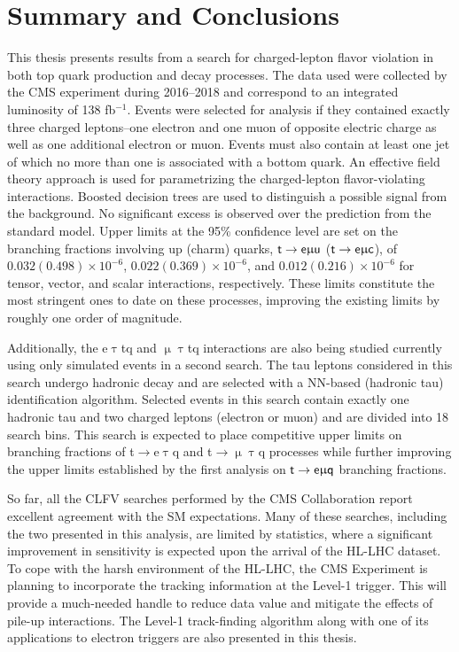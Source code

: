 \chapter{Summary and Conclusions}
\label{chap:Conclusion}

This thesis presents results from a search for charged-lepton flavor violation in both top quark production and decay processes. The data used were collected by the \ac{CMS} experiment during 2016--2018 and correspond to an integrated luminosity of 138 fb$^{-1}$. Events were selected for analysis if they contained exactly three charged leptons--one electron and one muon of opposite electric charge as well as one additional electron or muon. Events must also contain at least one jet of which no more than one is associated with a bottom quark. An effective field theory approach is used for parametrizing the charged-lepton flavor-violating interactions. Boosted decision trees are used to distinguish a possible signal from the background. No significant excess is observed over the prediction from the standard model. Upper limits at the 95\% confidence level are set on the branching fractions involving up (charm) quarks, $\textsf{t}\rightarrow\textsf{e}\upmu\textsf{u}$ ($\textsf{t}\rightarrow\textsf{e}\upmu\textsf{c}$), of $0.032 (0.498) \times 10^{-6}$, $0.022 (0.369) \times 10^{-6}$, and $0.012 (0.216) \times 10^{-6}$ for tensor, vector, and scalar interactions, respectively. These limits constitute the most stringent ones to date on these processes, improving the existing limits by roughly one order of magnitude.

Additionally, the e$\uptau$tq and $\upmu\uptau$tq interactions are also being studied currently using only simulated events in a second search. The tau leptons considered in this search undergo hadronic decay and are selected with a \ac{NN}-based (hadronic tau) identification algorithm. Selected events in this search contain exactly one hadronic tau and two charged leptons (electron or muon) and are divided into 18 search bins. This search is expected to place competitive upper limits on branching fractions of t$\rightarrow$e$\uptau$q and t$\rightarrow\upmu\uptau$q processes while further improving the upper limits established by the first analysis on $\textsf{t}\rightarrow\textsf{e}\upmu\textsf{q}$ branching fractions. 

So far, all the \ac{CLFV} searches performed by the \ac{CMS} Collaboration report excellent agreement with the \ac{SM} expectations. Many of these searches, including the two presented in this analysis, are limited by statistics, where a significant improvement in sensitivity is expected upon the arrival of the \ac{HL-LHC} dataset. To cope with the harsh environment of the \ac{HL-LHC}, the \ac{CMS} Experiment is planning to incorporate the tracking information at the Level-1 trigger. This will provide a much-needed handle to reduce data value and mitigate the effects of pile-up interactions. The Level-1 track-finding algorithm along with one of its applications to electron triggers are also presented in this thesis.
